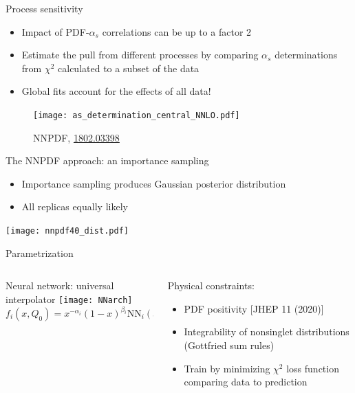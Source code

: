 \begin{frame}{Process sensitivity}
  \begin{itemize}
    \item Impact of PDF-$\alpha_s$ correlations can be up to a factor 2
    \item Estimate the pull from different processes by comparing $\alpha_s$ determinations from $\chi^2$ calculated to a subset of the data
    \item Global fits account for the effects of all data!
  \end{itemize}
  \begin{figure}
    \texttt{[image: as\_determination\_central\_NNLO.pdf]}
    \caption*{\color{gray} \footnotesize NNPDF, \hyperlink{https://arxiv.org/abs/1802.03398}{1802.03398}}
  \end{figure}
\end{frame}



\begin{frame}[t]{The NNPDF approach: an importance sampling}
  \begin{itemize}
    \item Importance sampling produces Gaussian posterior distribution
    \item All replicas equally likely
  \end{itemize}
  \begin{center}
    \texttt{[image: nnpdf40\_dist.pdf]}
  \end{center}
\end{frame}



\begin{frame}[t]{Parametrization}
  \begin{columns}[T]
      \begin{column}{0.48\textwidth}
        Neural network: universal interpolator
        \vspace*{0.3cm}
        \texttt{[image: NNarch]}
        \begin{equation*}
            f_{i}\left(x, Q_{0}\right)=x^{-\alpha_{i}}(1-x)^{\beta_{i}} \mathrm{NN}_{i}(x)
        \end{equation*}
      \end{column}
      \begin{column}{0.48\textwidth}
        Physical constraints:
        \begin{itemize}
            \item PDF positivity [JHEP 11 (2020)]
            \item Integrability of nonsinglet distributions (Gottfried sum rules)
        \end{itemize}
        \vspace*{0.3cm}
        \begin{itemize}
          \item Train by minimizing $\chi^2$ loss function comparing data to prediction\\
        \end{itemize}
      \end{column}
  \end{columns}
\end{frame}


